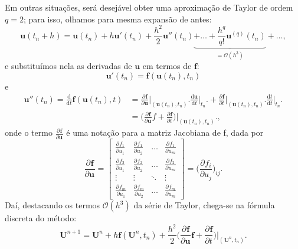 \documentclass[../differential_methods.tex]{subfiles}
\begin{document}
Em outras situações, será desejável obter uma aproximação de Taylor de ordem \(q=2\); para isso, olhamos para mesma expansão de antes:
\[
	\mathbf{u}(t_{n}+h) = \mathbf{u}(t_{n}) + h \mathbf{u}'(t_{n}) + \frac{h^{2}}{2}\mathbf{u}''(t_{n}) \underbrace{+\dotsc +\frac{h^{q}}{q!}\mathbf{u}^{(q)}(t_{n})}_{= \mathcal{O}(h^{3})}+\dotsc,
\]
e substituímos nela as derivadas de \(\mathbf{u}\) em termos de \(\mathbf{f}\):
\[
	\mathbf{u}'(t_{n}) = \mathbf{f}(\mathbf{u}(t_{n}), t_{n})
\]
e
\begin{align*}
	\mathbf{u}''(t_{n}) = \frac{\mathrm{d}}{\mathrm{d}t}\mathbf{f}(\mathbf{u}(t_{n}), t) & = \frac{\partial^{}\mathbf{f}}{\partial \mathbf{u}^{}}\biggl|_{(\mathbf{u}(t_{n}), t_{n})}^{}\biggr. \frac{\mathrm{d}\mathbf{u}}{\mathrm{d}t}\biggl|_{t_{n}}^{}\biggr. + \frac{\partial^{}\mathbf{f}}{\partial t^{}}\biggl|_{(\mathbf{u}(t_{n}), t_{n})}^{}\biggr. \frac{\mathrm{d}t}{\mathrm{d}t}\biggl|_{t_{n}}^{}\biggr. \\
	                                                                                     & =\biggl(\frac{\partial^{}\mathbf{f}}{\partial \mathbf{u}^{}} f + \frac{\partial^{}\mathbf{f}}{\partial t^{}}\biggr)\biggl|_{(\mathbf{u}(t_{n}), t_{n})}^{}\biggr.,
\end{align*}
onde o termo \(\displaystyle \frac{\partial^{}\mathbf{f}}{\partial \mathbf{u}^{}}\) é uma notação para a matriz Jacobiana de f, dada por
\[
	\frac{\partial^{}\mathbf{f}}{\partial \mathbf{u}^{}} = \begin{bmatrix}
		\frac{\partial^{}f_1}{\partial u_1^{}} & \frac{\partial^{}f_1}{\partial u_2^{}} & \dotsc & \frac{\partial^{}f_1}{\partial u_{m}^{}} \\
		\frac{\partial^{}f_2}{\partial u_1^{}} & \frac{\partial^{}f_2}{\partial u_2^{}} & \dotsc & \frac{\partial^{}f_2}{\partial u_{m}^{}} \\
		\vdots                                 & \vdots                                 & \ddots & \vdots                                   \\
		\frac{\partial^{}f_m}{\partial u_1^{}} & \frac{\partial^{}f_m}{\partial u_2^{}} & \dotsc & \frac{\partial^{}f_m}{\partial u_{m}^{}}
	\end{bmatrix} = \biggl(\frac{\partial^{}f_{i}}{\partial u_{j}^{}}\biggr)_{ij}.
\]
Daí, destacando os termos \(\mathcal{O}(h^{3})\) da série de Taylor, chega-se na fórmula discreta do método:
\[
	\mathbf{U}^{n+1} = \mathbf{U}^{n} + h \mathbf{f}(\mathbf{U}^{n}, t_{n}) + \frac{h^{2}}{2}\biggl(\frac{\partial^{}\mathbf{f}}{\partial \mathbf{u}^{}}\mathbf{f} + \frac{\partial^{}\mathbf{f}}{\partial t^{}}\biggr)\biggl|_{(\mathbf{U}^{n}, t_{n})}^{}\biggr.
\]
\end{document}
